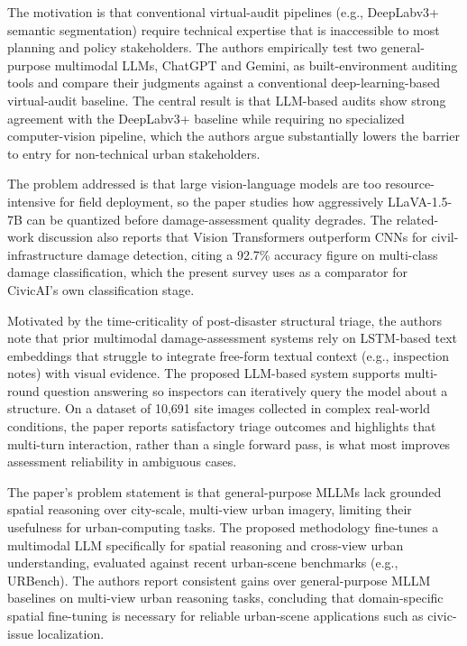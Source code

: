 \documentclass[conference]{IEEEtran}
\begin{document}
\cite{l9mllmaudit} The motivation is that conventional virtual-audit pipelines (e.g., DeepLabv3+ semantic segmentation) require technical expertise that is inaccessible to most planning and policy stakeholders. The authors empirically test two general-purpose multimodal LLMs, ChatGPT and Gemini, as built-environment auditing tools and compare their judgments against a conventional deep-learning-based virtual-audit baseline. The central result is that LLM-based audits show strong agreement with the DeepLabv3+ baseline while requiring no specialized computer-vision pipeline, which the authors argue substantially lowers the barrier to entry for non-technical urban stakeholders.

\cite{l10quantizedvlm} The problem addressed is that large vision-language models are too resource-intensive for field deployment, so the paper studies how aggressively LLaVA-1.5-7B can be quantized before damage-assessment quality degrades. The related-work discussion also reports that Vision Transformers outperform CNNs for civil-infrastructure damage detection, citing a 92.7\% accuracy figure on multi-class damage classification, which the present survey uses as a comparator for CivicAI's own classification stage.

\cite{l11llmearthquake} Motivated by the time-criticality of post-disaster structural triage, the authors note that prior multimodal damage-assessment systems rely on LSTM-based text embeddings that struggle to integrate free-form textual context (e.g., inspection notes) with visual evidence. The proposed LLM-based system supports multi-round question answering so inspectors can iteratively query the model about a structure. On a dataset of 10,691 site images collected in complex real-world conditions, the paper reports satisfactory triage outcomes and highlights that multi-turn interaction, rather than a single forward pass, is what most improves assessment reliability in ambiguous cases.

\cite{l12urbanllava} The paper's problem statement is that general-purpose MLLMs lack grounded spatial reasoning over city-scale, multi-view urban imagery, limiting their usefulness for urban-computing tasks. The proposed methodology fine-tunes a multimodal LLM specifically for spatial reasoning and cross-view urban understanding, evaluated against recent urban-scene benchmarks (e.g., URBench). The authors report consistent gains over general-purpose MLLM baselines on multi-view urban reasoning tasks, concluding that domain-specific spatial fine-tuning is necessary for reliable urban-scene applications such as civic-issue localization.
\end{document}
